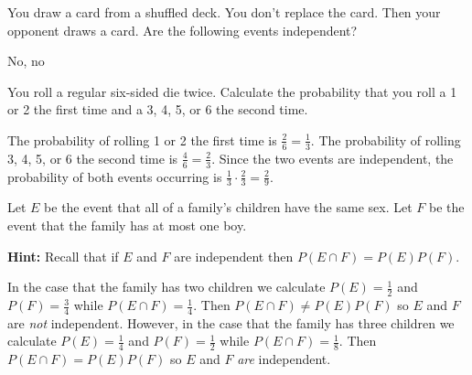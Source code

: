 \documentclass[12pt]{exam}
\begin{document}
\begin{questions}
\question You draw a card from a shuffled deck. You don't replace
the card. Then your opponent draws a card. Are the following events
independent?
\begin{solution} No, no\end{solution}

\question You roll a regular six-sided die twice. Calculate
the probability that you roll a 1 or 2 the first time and a
3, 4, 5, or 6 the second time.
\begin{solution} The probability of rolling 1 or 2 the first
time is $\frac{2}{6}=\frac{1}{3}$.
The probability of rolling 3, 4, 5, or 6 the second time
is $\frac{4}{6}=\frac{2}{3}$.
Since the two events are independent, the probability of both
events occurring is $\frac{1}{3}\cdot\frac{2}{3}=\frac{2}{9}$. \end{solution}

\question Let $E$ be the event that all of a family's children
have the same sex. Let $F$ be the event that the family has
at most one boy.
{\bf Hint:} Recall that if $E$ and $F$ are independent then
$P\left(E\cap F\right)=P\left(E\right)P\left(F\right)$.
\begin{solution}
In the case that the family has two children we calculate
$P\left(E\right)=\frac{1}{2}$ and $P\left(F\right)=\frac{3}{4}$
while $P\left(E\cap F\right)=\frac{1}{4}$. Then
$P\left(E\cap F\right)\ne P\left(E\right)P\left(F\right)$
so $E$ and $F$ are {\em not} independent.
However, in the case that the family has three children we calculate
$P\left(E\right)=\frac{1}{4}$ and $P\left(F\right)=\frac{1}{2}$
while $P\left(E\cap F\right)=\frac{1}{8}$. Then
$P\left(E\cap F\right)=P\left(E\right)P\left(F\right)$
so $E$ and $F$ {\em are} independent.
\end{solution}


\end{questions}
\end{document}
